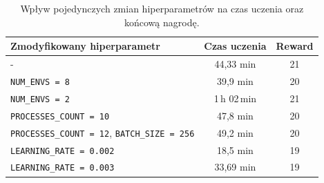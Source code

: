 \documentclass[12pt,a4paper]{article}
\begin{document}
\begin{table}[h]
  \centering
  \caption{Wpływ pojedynczych zmian hiperparametrów na czas uczenia
           oraz końcową nagrodę.}
  \label{tab:hparam_ablation}
  \begin{tabular}{@{}lcc@{}}
    \toprule
    \textbf{Zmodyfikowany hiperparametr} & \textbf{Czas uczenia} & \textbf{Reward} \\
    \midrule
    -                      & 44,33 min & 21 \\
    \texttt{NUM\_ENVS = 8}                       & 39{,}9 min & 20 \\
    \texttt{NUM\_ENVS = 2}                       & 1\,h 02\,min & 21 \\
    \texttt{PROCESSES\_COUNT = 10}               & 47{,}8 min & 20 \\
    \texttt{PROCESSES\_COUNT = 12}, \texttt{BATCH\_SIZE = 256} & 49{,}2 min & 20 \\
    \texttt{LEARNING\_RATE = 0.002}              & 18{,}5 min & 19 \\
    \texttt{LEARNING\_RATE = 0.003}              & 33{,}69 min & 19 \\
    \bottomrule
  \end{tabular}
\end{table}


\end{document}
